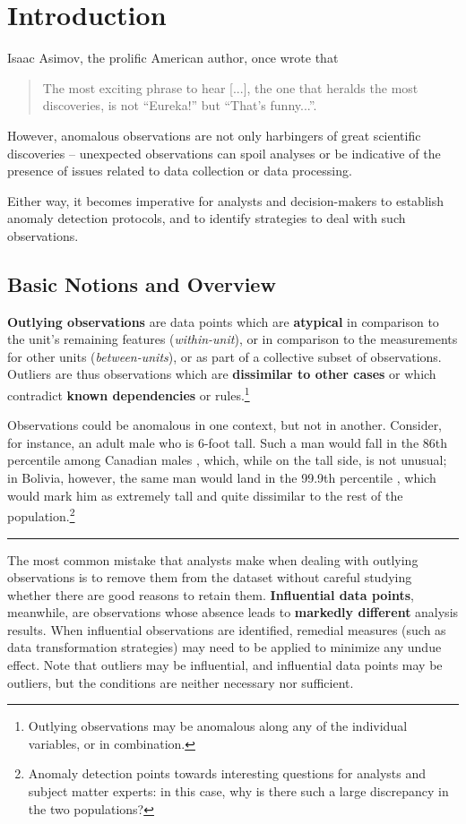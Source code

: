 \newpage\section{Introduction} Isaac Asimov, the prolific American author, once wrote that \begin{quote} The most exciting phrase to hear [...], the one that heralds the most discoveries, is not ``Eureka!'' but ``That's funny...''.\end{quote}
However, anomalous observations are not only harbingers of great scientific discoveries -- unexpected observations can spoil analyses or be indicative of the presence of issues related to data collection or data processing. \par Either way, it becomes imperative for analysts and decision-makers to establish anomaly detection protocols, and to identify strategies to deal with such observations.  
\subsection{Basic Notions and Overview}
\textbf{Outlying observations} are data points which are \textbf{atypical} in comparison to the unit's remaining features (\textit{within-unit}), or in comparison to the measurements for other units (\textit{between-units}), or as part of a collective subset of observations. Outliers are thus observations which are \textbf{dissimilar to other cases} or which contradict \textbf{known dependencies} or rules.\footnote{Outlying observations may be anomalous along any of the individual variables, or in combination.}%
\par Observations could be anomalous in one context, but not in another. Consider, for instance, an adult male who is 6-foot tall. Such a man would fall in the 86th percentile among Canadian males \cite{DP_HPC}, which, while on the tall side, is not unusual; in Bolivia, however, the same man would land in the 99.9th percentile \cite{DP_HPC}, which would mark him as extremely tall and quite dissimilar to the rest of the population.\footnote{Anomaly detection points towards interesting questions for analysts and subject matter experts: in this case, why is there such a large discrepancy in the two populations?}  
\begin{center}
    \rule{0.5\textwidth}{.4pt}
\end{center}
The most common mistake that analysts make when dealing with outlying observations is to remove them from the dataset without careful studying whether there are good reasons to retain them. \newl \textbf{Influential data points}, meanwhile, are observations whose absence leads to \textbf{markedly different} analysis results. When influential observations are identified, remedial measures (such as data transformation strategies) may need to be applied to minimize any undue effect. Note that outliers may be influential, and influential data points may be outliers, but the conditions are neither necessary nor sufficient. 
